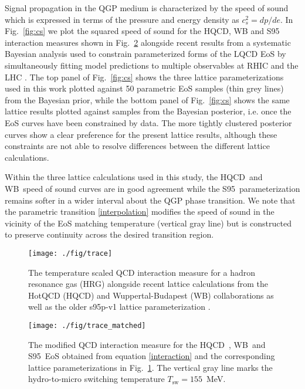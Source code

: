 \documentclass[aps,prc,reprint,amsmath,nofootinbib,superscriptaddress]{revtex4-1}
\newcommand{\hotqcd}{HQCD~}
\newcommand{\wb}{WB~}
\newcommand{\spv}{S95~}
\begin{document}
Signal propagation in the QGP medium is characterized by the speed of sound which is expressed in terms of the pressure and energy density as $c_s^2 = dp/de$.
In Fig.~\ref{fig:cs} we plot the squared speed of sound for the HQCD, WB and S95 interaction measures shown in Fig.~\ref{fig:trace_final} alongside recent results from a systematic Bayesian analysis used to constrain parameterized forms of the LQCD EoS by simultaneously fitting model predictions to multiple observables at RHIC and the LHC \cite{Pratt:2015zsa}. 
The top panel of Fig.~\ref{fig:cs} shows the three lattice parameterizations used in this work plotted against 50 parametric EoS samples (thin grey lines) from the Bayesian prior, while the bottom panel of Fig.~\ref{fig:cs} shows the same lattice results plotted against samples from the Bayesian posterior, i.e. once the EoS curves have been constrained by data. The more tightly clustered posterior curves show a clear preference for the present lattice results, although these constraints are not able to resolve differences between the different lattice calculations.

Within the three lattice calculations used in this study, the \hotqcd and \wb speed of sound curves are in good agreement while the \spv parameterization remains softer in a wider interval about the QGP phase transition. We note that the parametric transition \eqref{interpolation} modifies the speed of sound in the vicinity of the EoS matching temperature (vertical gray line) but is constructed to preserve continuity across the desired transition region.

\begin{figure}[t]
  \texttt{[image: ./fig/trace]}
  \caption{\label{fig:trace} The temperature scaled QCD interaction measure for a hadron resonance gas (HRG) alongside recent lattice calculations from the HotQCD (HQCD) and Wuppertal-Budapest (WB) collaborations as well as the older s95p-v1 lattice parameterization \cite{Bazavov:2014pvz, Borsanyi:2013bia, Huovinen:2009yb}.}
\end{figure}

\begin{figure}[b]
  \texttt{[image: ./fig/trace\_matched]}
  \caption{\label{fig:trace_final} The modified QCD interaction measure for the \hotqcd, \wb and \spv EoS obtained from equation \eqref{interaction} and the corresponding lattice
	  parameterizations in Fig.~\ref{fig:trace}. The vertical gray line marks the hydro-to-micro switching temperature $T_\text{sw} = 155$~MeV.}
\end{figure}
\end{document}
